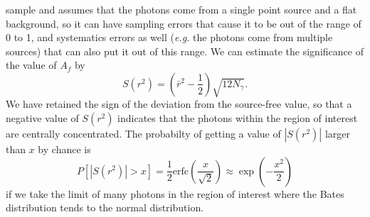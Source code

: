 \documentclass[useAMS,usenatbib]{mn2e}
\begin{document}
sample and assumes that the photons come from a single point source
and a flat background, so it can have sampling errors that cause it to
be out of the range of 0 to 1, and systematics errors as well
({\em e.g.} the photons come from multiple sources) that can also put it out
of this range. We can estimate the significance of the value of $A_f$ by
\begin{equation}
  S(r^2) = \left ( \bar r^2-\frac{1}{2} \right ) \sqrt{12 N_\gamma}.
\label{eq:12}
\end{equation}
We have retained the sign of the deviation from the source-free value,
so that a negative value of $S(r^2)$ indicates that the photons within
the region of interest are centrally concentrated.  The probabilty of
getting a value of $|S(r^2)|$ larger than $x$ by chance is
\begin{equation}
  P\left [ |S(r^2)| > x \right ] = \frac{1}{2} \mathrm{erfc} \left ( \frac{x}{\sqrt{2}} \right
  ) \approx \exp \left (-\frac{x^2}{2} \right )
  \label{eq:13}
\end{equation}
if we take the limit of many photons in the region of interest where
the Bates distribution tends to the normal distribution.  
\end{document}
